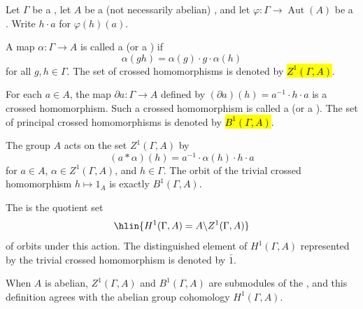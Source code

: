 \begin{definition} \label{definition:nonabelian_group_1_cocycles_and_first_cohomology_set_of_a_group_acting_on_a_group}
    Let $\Gamma$ be a , let $A$ be a (not necessarily abelian) , and let $\varphi: \Gamma \to \operatorname{Aut}(A)$ be a . Write $h \cdot a$ for $\varphi(h)(a)$.

    A map $\alpha: \Gamma \to A$ is called a  (or a ) if
    $$\alpha(gh) = \alpha(g) \cdot g \cdot \alpha(h)$$
    for all $g,h \in \Gamma$. The set of crossed homomorphisms is denoted by \hl{$Z^1(\Gamma, A)$}.

    For each $a \in A$, the map $\partial a: \Gamma \to A$ defined by $(\partial a)(h) = a^{-1} \cdot h \cdot a$ is a crossed homomorphism. Such a crossed homomorphism is called a  (or a ). The set of principal crossed homomorphisms is denoted by \hl{$B^1(\Gamma, A)$}.

    The group $A$ acts on the set $Z^1(\Gamma, A)$ by
    $$(a * \alpha)(h) = a^{-1} \cdot \alpha(h) \cdot h \cdot a$$
    for $a \in A$, $\alpha \in Z^1(\Gamma, A)$, and $h \in \Gamma$. The orbit of the trivial crossed homomorphism $h \mapsto 1_A$ is exactly $B^1(\Gamma, A)$.

    The  is the quotient set
    $$\hlin{H^1(\Gamma, A) = A \backslash Z^1(\Gamma, A)}$$
    of orbits under this action. The distinguished element of $H^1(\Gamma, A)$ represented by the trivial crossed homomorphism is denoted by $\bar{1}$.

    When $A$ is abelian, $Z^1(\Gamma, A)$ and $B^1(\Gamma, A)$ are submodules of the , and this definition agrees with the abelian group cohomology $H^1(\Gamma, A)$.
\end{definition}

